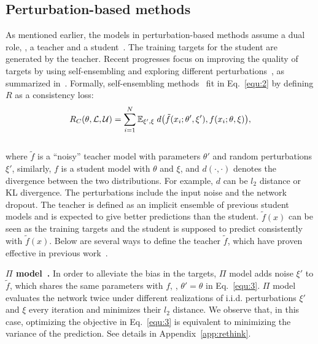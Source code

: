 \documentclass[10pt,twocolumn,letterpaper]{article}
\begin{document}
\subsection{Perturbation-based methods}
\label{sec:perturb}
As mentioned earlier, the models in perturbation-based methods assume a dual role, \ie, a teacher and a student~\cite{lopez2015unifying}. The training targets for the student are generated by the teacher. Recent progresses focus on improving the quality of targets by using self-ensembling and exploring different perturbations~\cite{laine2016temporal,tarvainen2017mean,miyato2017virtual}, as summarized in~\cite{tarvainen2017mean}.
Formally, self-ensembling methods~\cite{laine2016temporal,tarvainen2017mean}
fit in Eq.~\eqref{equ:2} by defining $R$ as a consistency loss:\\[-.5cm]
\begin{eqnarray}\vspace{-0.2cm}
\label{equ:3}
R_C(\theta, \mathcal{L}, \mathcal{U}) = \sum_{i=1}^{N}\mathbb{E}_{\xi',\xi} \;d \big(\tilde f(x_i;\theta', \xi'), f(x_i;\theta, \xi)\big) ,
\end{eqnarray}\\[-.4cm]
where $\tilde{f}$ is a ``noisy'' teacher model with parameters $\theta'$ and random perturbations $\xi'$, similarly, $f$ is a student model with $\theta$ and $\xi$, and $d(\cdot,\cdot)$ denotes the divergence between the two distributions. For example, $d$ can be $l_2$ distance or KL divergence. The perturbations include the input noise and the network dropout. The teacher is defined as an implicit ensemble of previous student models and is expected to give better predictions than the student. $\tilde{f}(x)$ can be seen as the training targets and the student is supposed to predict consistently with $\tilde{f}(x)$. Below are several ways to define the teacher $\tilde{f}$, which have proven effective in previous work~\cite{laine2016temporal,tarvainen2017mean,miyato2017virtual}.


\textbf{$\Pi$ model~\cite{laine2016temporal}.} In order to alleviate the bias in the targets, $\Pi$ model adds noise $\xi'$ to $\tilde f$, which shares the same parameters with $f$, \ie, $\theta' = \theta$ in Eq.~\eqref{equ:3}. $\Pi$ model evaluates the network twice under different realizations of i.i.d. perturbations $\xi'$ and $\xi$ every iteration and minimizes their $l_2$ distance. We observe that, in this case, optimizing the objective in Eq.~\eqref{equ:3} is equivalent to minimizing the variance of the prediction. See details in Appendix~\ref{app:rethink}.
\end{document}
